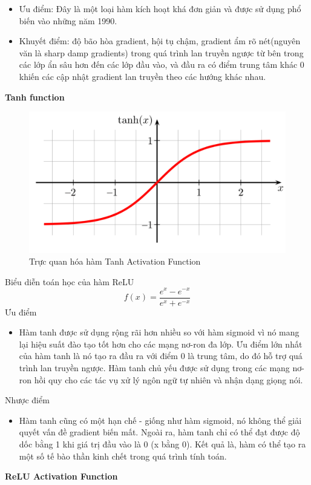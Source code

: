 \documentclass{article}
\begin{document}
	\begin{itemize}
		\item Ưu điểm: Đây là một loại hàm kích hoạt khá đơn giản và được sử dụng phổ biến vào những năm 1990.
		\item Khuyết điểm: độ bão hòa gradient, hội tụ chậm, gradient ẩm rõ nét(nguyên văn là sharp damp gradients) trong quá trình lan truyền ngược từ bên trong các lớp ẩn sâu hơn đến các lớp đầu vào, và đầu ra có điểm trung tâm khác 0 khiến các cập nhật gradient lan truyền theo các hướng khác nhau.
	\end{itemize}
	\textbf{Tanh function}\newline
	\begin{figure}[H]
		\centering
		\includegraphics[width=0.75\linewidth]{images/a5_5.png}
		\caption{Trực quan hóa hàm Tanh Activation Function}
		\label{fig:writing-thesis}
	\end{figure}
	Biểu diễn toán học của hàm ReLU
	$$f(x) = \frac{e^x - e^{-x}}{e^x +  e^{-x}}$$
	Ưu điểm
	\begin{itemize}
		\item Hàm tanh được sử dụng rộng rãi hơn nhiều so với hàm sigmoid vì nó mang lại hiệu suất đào tạo tốt hơn cho các mạng nơ-ron đa lớp. Ưu điểm lớn nhất của hàm tanh là nó tạo ra đầu ra với điểm 0 là trung tâm, do đó hỗ trợ quá trình lan truyền ngược. Hàm tanh chủ yếu được sử dụng trong các mạng nơ-ron hồi quy cho các tác vụ xử lý ngôn ngữ tự nhiên và nhận dạng giọng nói.
	\end{itemize}
	Nhược điểm
	\begin{itemize}
		\item Hàm tanh cũng có một hạn chế - giống như hàm sigmoid, nó không thể giải quyết vấn đề gradient biến mất. Ngoài ra, hàm tanh chỉ có thể đạt được độ dốc bằng 1 khi giá trị đầu vào là 0 (x bằng 0). Kết quả là, hàm có thể tạo ra một số tế bào thần kinh chết trong quá trình tính toán.
	\end{itemize}
	\textbf{ReLU Activation Function}\newline
\end{document}
